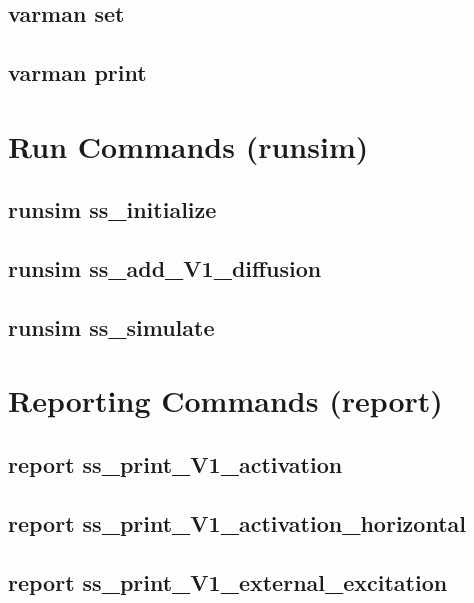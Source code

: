 %
%

\subsection{varman set}

\subsection{varman print}

\section{Run Commands (runsim)}

\subsection{runsim ss\_initialize}

\subsection{runsim ss\_add\_V1\_diffusion}

\subsection{runsim ss\_simulate}

\section{Reporting Commands (report)}

\subsection{report ss\_print\_V1\_activation}

\subsection{report ss\_print\_V1\_activation\_horizontal}

\subsection{report ss\_print\_V1\_external\_excitation}

